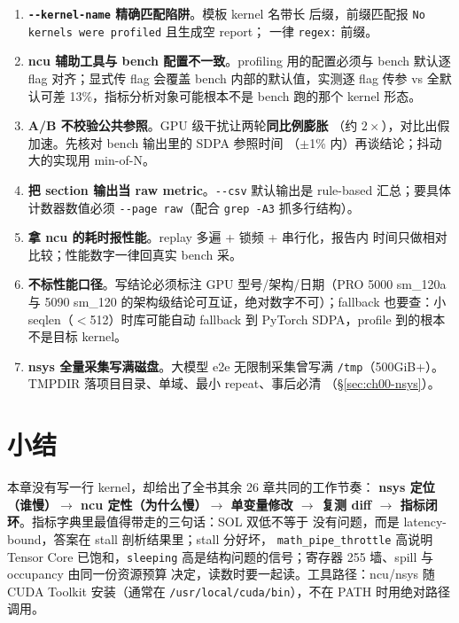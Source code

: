 \begin{enumerate}
\item \textbf{\texttt{-{}-kernel-name} 精确匹配陷阱}。模板 kernel 名带长
  后缀，前缀匹配报 \texttt{No kernels were profiled} 且生成空 report；
  一律 \texttt{regex:} 前缀。
\item \textbf{ncu 辅助工具与 bench 配置不一致}。profiling 用的配置必须与
  bench 默认逐 flag 对齐；显式传 flag 会覆盖 bench 内部的默认值，实测逐
  flag 传参 vs 全默认可差 13\%，指标分析对象可能根本不是 bench 跑的那个
  kernel 形态。
\item \textbf{A/B 不校验公共参照}。GPU 级干扰让两轮\textbf{同比例膨胀}
  （约 $2\times$），对比出假加速。先核对 bench 输出里的 SDPA 参照时间
  （$\pm$1\% 内）再谈结论；抖动大的实现用 min-of-N。
\item \textbf{把 section 输出当 raw metric}。\texttt{-{}-csv} 默认输出是
  rule-based 汇总；要具体计数器数值必须 \texttt{-{}-page raw}（配合
  \texttt{grep -A3} 抓多行结构）。
\item \textbf{拿 ncu 的耗时报性能}。replay 多遍 + 锁频 + 串行化，报告内
  时间只做相对比较；性能数字一律回真实 bench 采。
\item \textbf{不标性能口径}。写结论必须标注 GPU 型号/架构/日期（PRO 5000
  sm\_120a 与 5090 sm\_120 的架构级结论可互证，绝对数字不可）；fallback
  也要查：小 seqlen（$<$512）时库可能自动 fallback 到 PyTorch SDPA，profile
  到的根本不是目标 kernel。
\item \textbf{nsys 全量采集写满磁盘}。大模型 e2e 无限制采集曾写满
  \texttt{/tmp}（500GiB+）。TMPDIR 落项目目录、单域、最小 repeat、事后必清
  （\S\ref{sec:ch00-nsys}）。
\end{enumerate}

\section{小结}

本章没有写一行 kernel，却给出了全书其余 26 章共同的工作节奏：
\textbf{nsys 定位（谁慢）$\to$ ncu 定性（为什么慢）$\to$ 单变量修改 $\to$
复测 diff $\to$ 指标闭环}。指标字典里最值得带走的三句话：SOL 双低不等于
没有问题，而是 latency-bound，答案在 stall 剖析结果里；stall 分好坏，
\texttt{math\_\allowbreak{}pipe\_\allowbreak{}throttle} 高说明 Tensor Core 已饱和，\texttt{sleeping}
高是结构问题的信号；寄存器 255 墙、spill 与 occupancy 由同一份资源预算
决定，读数时要一起读。工具路径：ncu/nsys 随 CUDA Toolkit 安装（通常在
\texttt{/\allowbreak{}usr/\allowbreak{}local/\allowbreak{}cuda/\allowbreak{}bin}），不在 PATH 时用绝对路径调用。

